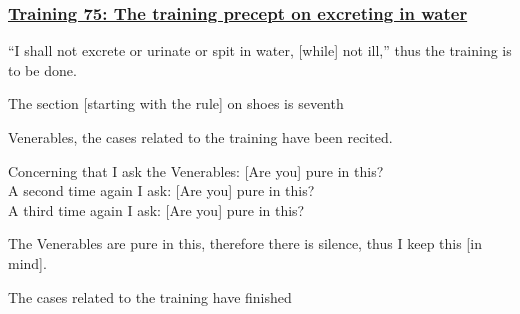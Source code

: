 \subsubsection*{\hyperref[sekh75]{Training 75: The training precept on excreting in water}}
\label{training75}
``I shall not excrete or urinate or spit in water, [while] not ill,'' thus the training is to be done.

\begin{center}
  The section [starting with the rule] on shoes is seventh
\end{center}

\medskip

\begin{center}
Venerables, the cases related to the training have been recited.

\smallskip

Concerning that I ask the Venerables: [Are you] pure in this?\\
A second time again I ask: [Are you] pure in this?\\
A third time again I ask: [Are you] pure in this?

\smallskip

The Venerables are pure in this, therefore there is silence, thus I keep this [in mind].
\end{center}

\begin{outro}
  The cases related to the training have finished
\end{outro}

\clearpage
